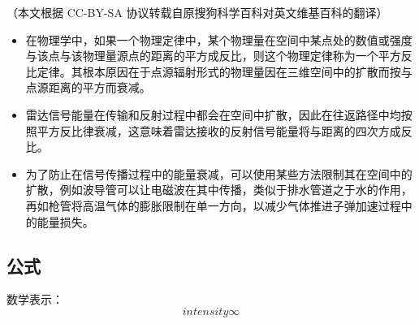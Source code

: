 
（本文根据 CC-BY-SA 协议转载自原搜狗科学百科对英文维基百科的翻译）
\begin{itemize}
\item 在物理学中，如果一个物理定律中，某个物理量在空间中某点处的数值或强度与该点与该物理量源点的距离的平方成反比，则这个物理定律称为一个平方反比定律。其根本原因在于点源辐射形式的物理量因在三维空间中的扩散而按与点源距离的平方而衰减。
\item 雷达信号能量在传输和反射过程中都会在空间中扩散，因此在往返路径中均按照平方反比律衰减，这意味着雷达接收的反射信号能量将与距离的四次方成反比。
\item 为了防止在信号传播过程中的能量衰减，可以使用某些方法限制其在空间中的扩散，例如波导管可以让电磁波在其中传播，类似于排水管道之于水的作用，再如枪管将高温气体的膨胀限制在单一方向，以减少气体推进子弹加速过程中的能量损失。
\end{itemize}
\subsection{公式}
数学表示：
\begin{equation}
intensity \infty
\end{equation}

